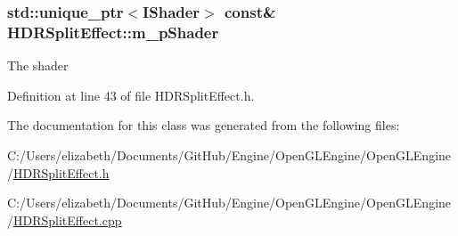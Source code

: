 \subsubsection[{\texorpdfstring{m\+\_\+p\+Shader}{m_pShader}}]{\setlength{\rightskip}{0pt plus 5cm}std\+::unique\+\_\+ptr$<${\bf I\+Shader}$>$ const\& H\+D\+R\+Split\+Effect\+::m\+\_\+p\+Shader\hspace{0.3cm}{\ttfamily [private]}}\hypertarget{class_h_d_r_split_effect_a9287e35ef3eb82b745d8474e455913d0}{}\label{class_h_d_r_split_effect_a9287e35ef3eb82b745d8474e455913d0}


The shader 



Definition at line 43 of file H\+D\+R\+Split\+Effect.\+h.



The documentation for this class was generated from the following files\+:\begin{DoxyCompactItemize}
\item 
C\+:/\+Users/elizabeth/\+Documents/\+Git\+Hub/\+Engine/\+Open\+G\+L\+Engine/\+Open\+G\+L\+Engine/\hyperlink{_h_d_r_split_effect_8h}{H\+D\+R\+Split\+Effect.\+h}\item 
C\+:/\+Users/elizabeth/\+Documents/\+Git\+Hub/\+Engine/\+Open\+G\+L\+Engine/\+Open\+G\+L\+Engine/\hyperlink{_h_d_r_split_effect_8cpp}{H\+D\+R\+Split\+Effect.\+cpp}\end{DoxyCompactItemize}
